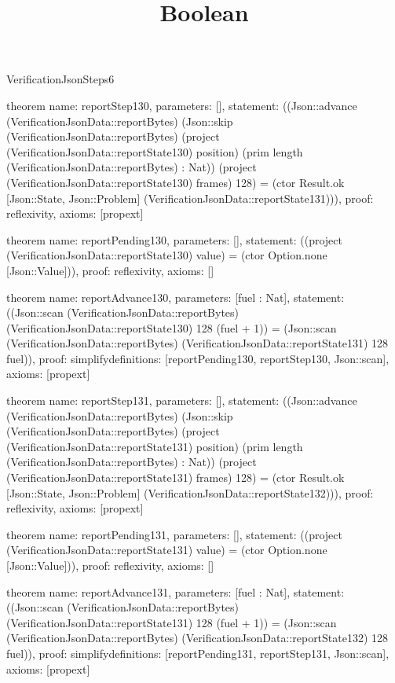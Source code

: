 \begin{lexlean}{VerificationJsonSteps6}
\title{Boolean}
\begin{semanticmodule}

theorem{
  name: reportStep130,
  parameters: [],
  statement: ((Json::advance (VerificationJsonData::reportBytes) (Json::skip (VerificationJsonData::reportBytes) (project (VerificationJsonData::reportState130) position) (prim length (VerificationJsonData::reportBytes) : Nat)) (project (VerificationJsonData::reportState130) frames) 128) = (ctor Result.ok [Json::State, Json::Problem] (VerificationJsonData::reportState131))),
  proof: reflexivity{},
  axioms: [propext]
}

theorem{
  name: reportPending130,
  parameters: [],
  statement: ((project (VerificationJsonData::reportState130) value) = (ctor Option.none [Json::Value])),
  proof: reflexivity{},
  axioms: []
}

theorem{
  name: reportAdvance130,
  parameters: [fuel : Nat],
  statement: ((Json::scan (VerificationJsonData::reportBytes) (VerificationJsonData::reportState130) 128 (fuel + 1)) = (Json::scan (VerificationJsonData::reportBytes) (VerificationJsonData::reportState131) 128 fuel)),
  proof: simplify{definitions: [reportPending130, reportStep130, Json::scan]},
  axioms: [propext]
}

theorem{
  name: reportStep131,
  parameters: [],
  statement: ((Json::advance (VerificationJsonData::reportBytes) (Json::skip (VerificationJsonData::reportBytes) (project (VerificationJsonData::reportState131) position) (prim length (VerificationJsonData::reportBytes) : Nat)) (project (VerificationJsonData::reportState131) frames) 128) = (ctor Result.ok [Json::State, Json::Problem] (VerificationJsonData::reportState132))),
  proof: reflexivity{},
  axioms: [propext]
}

theorem{
  name: reportPending131,
  parameters: [],
  statement: ((project (VerificationJsonData::reportState131) value) = (ctor Option.none [Json::Value])),
  proof: reflexivity{},
  axioms: []
}

theorem{
  name: reportAdvance131,
  parameters: [fuel : Nat],
  statement: ((Json::scan (VerificationJsonData::reportBytes) (VerificationJsonData::reportState131) 128 (fuel + 1)) = (Json::scan (VerificationJsonData::reportBytes) (VerificationJsonData::reportState132) 128 fuel)),
  proof: simplify{definitions: [reportPending131, reportStep131, Json::scan]},
  axioms: [propext]
}


\end{semanticmodule}
\end{lexlean}

